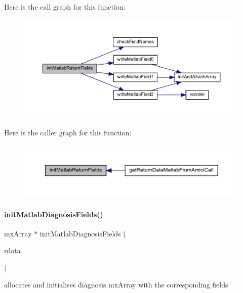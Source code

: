 Here is the call graph for this function\+:
\nopagebreak
\begin{figure}[H]
\begin{center}
\leavevmode
\includegraphics[width=350pt]{namespaceamici_a7449834fca1e0bde53d5f73ae0d2b929_cgraph}
\end{center}
\end{figure}
Here is the caller graph for this function\+:
\nopagebreak
\begin{figure}[H]
\begin{center}
\leavevmode
\includegraphics[width=350pt]{namespaceamici_a7449834fca1e0bde53d5f73ae0d2b929_icgraph}
\end{center}
\end{figure}
\mbox{\label{namespaceamici_aa12d4917fed647a1edeaaa26a261c770}} 
\paragraph{\texorpdfstring{init\+Matlab\+Diagnosis\+Fields()}{initMatlabDiagnosisFields()}}
{\footnotesize\ttfamily mx\+Array $\ast$ init\+Matlab\+Diagnosis\+Fields (\begin{DoxyParamCaption}\item[{\mbox{\hyperlink{classamici_1_1_return_data}{Return\+Data}} const $\ast$}]{rdata }\end{DoxyParamCaption})}

allocates and initialises diagnosis mx\+Array with the corresponding fields


